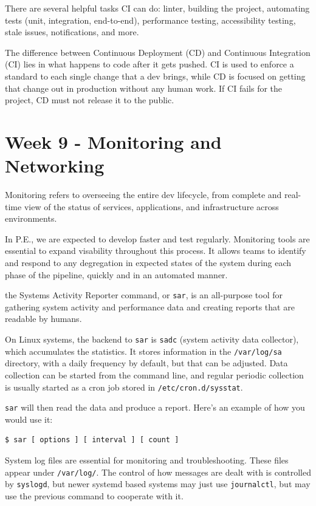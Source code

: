 \documentclass[11pt]{article}
\begin{document}
\noindent There are several helpful tasks CI can do: linter, building the project, automating tests (unit, integration, end-to-end), performance testing, accessibility testing, stale issues, notifications, and more. 

\noindent The difference between Continuous Deployment (CD) and Continuous Integration (CI) lies in what happens to code after it gets pushed. CI is used to enforce a standard to each single change that a dev brings, while CD is focused on getting that change out in production without any human work. If CI fails for the project, CD must not release it to the public. 


\section*{Week 9 - Monitoring and Networking}
Monitoring refers to overseeing the entire dev lifecycle, from complete and real-time view of the status of services, applications, and infrastructure across environments.

\noindent In P.E., we are expected to develop faster and test regularly. Monitoring tools are essential to expand visability throughout this process. It allows teams to identify and respond to any degregation in expected states of the system during each phase of the pipeline, quickly and in an automated manner.

\noindent the Systems Activity Reporter command, or \texttt{sar}, is an all-purpose tool for gathering system activity and performance data and creating reports that are readable by humans. 

On Linux systems, the backend to \texttt{sar} is \texttt{sadc} (system activity data collector), which accumulates the statistics. It stores information in the \texttt{/var/log/sa} directory, with a daily frequency by default, but that can be adjusted. Data collection can be started from the command line, and regular periodic collection is usually started as a cron job stored in \texttt{/etc/cron.d/sysstat}.

\noindent \texttt{sar} will then read the data and produce a report. Here's an example of how you would use it:

\begin{lstlisting}[language=python]
$ sar [ options ] [ interval ] [ count ]
\end{lstlisting}

\noindent System log files are essential for monitoring and troubleshooting. These files appear under \texttt{/var/log/}. The control of how messages are dealt with is controlled by \texttt{syslogd}, but newer systemd based systems may just use \texttt{journalctl}, but may use the previous command to cooperate with it.
\end{document}

